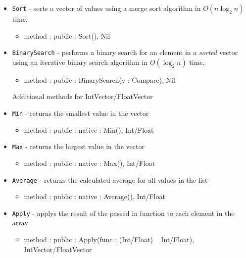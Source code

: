 \documentclass[12pt]{article}
\begin{document}
\begin{itemize}
    \item \texttt{Sort} - sorts a vector of values using a merge sort algorithm in $O(n \log_2 n)$ time.
    	\begin{itemize}
	\item method : public : Sort(), Nil
	\end{itemize}
    \item \texttt{BinarySearch} - performs a binary search for an element in a \emph{sorted} vector using an iterative binary search algorithm in $O(\log_2 n)$ time.
    	\begin{itemize}
	\item method : public : BinarySearch(v : Compare), Nil
	\end{itemize}
Additional methods for IntVector/FloatVector
    \item \texttt{Min} - returns the smallest value in the vector
    	\begin{itemize}
	\item method : public : native : Min(), Int/Float
	\end{itemize}
    \item \texttt{Max} - returns the largest value in the vector
    	\begin{itemize}
	\item method : public : native : Max(), Int/Float
	\end{itemize}
    \item \texttt{Average} - returns the calculated average for all values in the list
    	\begin{itemize}
	\item method : public : native : Average(), Int/Float
	\end{itemize}
    \item \texttt{Apply} - applys the result of the passed in function to each element in the array 
    	\begin{itemize}
	\item method : public : Apply(func : (Int/Float) ~ Int/Float), IntVector/FloatVector
	\end{itemize}
\end{itemize}
\end{document}
